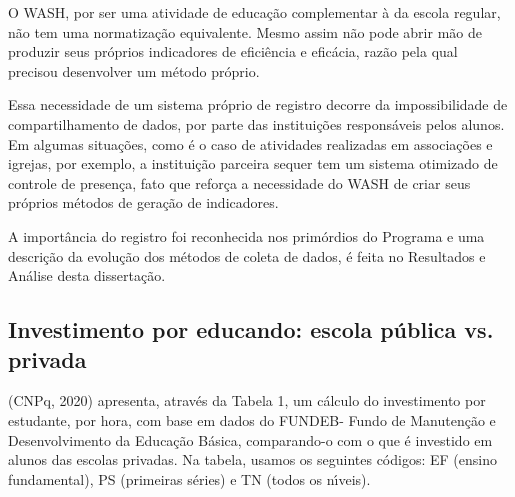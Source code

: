 \documentclass[
12pt,		%
openright,	%
twoside,  %
a4paper,			%
chapter=TITLE,		%
english,			%
french,				%
spanish,			%
brazil				%
]{USPSC-classe/USPSC}
\begin{document}
O WASH, por ser uma atividade de educa\c{c}\~ao complementar \`a da escola regular, n\~ao tem uma normatiza\c{c}\~ao equivalente. Mesmo assim n\~ao pode abrir m\~ao de produzir seus pr\'oprios indicadores de efici\^encia e efic\'acia, raz\~ao pela qual precisou desenvolver um m\'etodo pr\'oprio.









Essa necessidade de um sistema pr\'oprio de registro decorre da impossibilidade de compartilhamento de dados, por parte das institui\c{c}\~oes respons\'aveis pelos alunos. Em algumas situa\c{c}\~oes, como \'e o caso de atividades realizadas em associa\c{c}\~oes e igrejas, por exemplo, a institui\c{c}\~ao parceira sequer tem um sistema otimizado de controle de presen\c{c}a, fato que refor\c{c}a a necessidade do WASH de criar seus pr\'oprios m\'etodos de gera\c{c}\~ao de indicadores.









A import\^ancia do registro foi reconhecida nos prim\'ordios do Programa e uma descri\c{c}\~ao da evolu\c{c}\~ao dos m\'etodos de coleta de dados, \'e feita no Resultados e An\'alise desta disserta\c{c}\~ao.









\subsection[Investimento por educando: escola p\'ublica vs. privada]{Investimento por educando: escola p\'ublica vs. privada}\label{Investimento por educando: escola p\'ublica vs. privada}
(CNPq, 2020)  apresenta, atrav\'es da Tabela 1, um c\'alculo do investimento por estudante, por hora, com base em dados do FUNDEB- Fundo de Manuten\c{c}\~ao e Desenvolvimento da Educa\c{c}\~ao B\'asica, comparando-o com o que \'e investido em alunos das escolas privadas. Na tabela, usamos os seguintes c\'odigos: EF (ensino fundamental), PS (primeiras s\'eries) e TN (todos os n\'{\i}veis).
\end{document}
